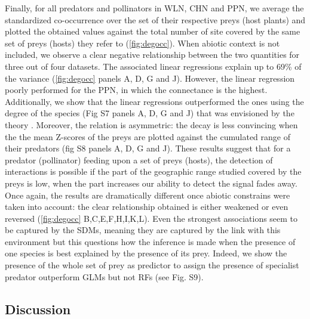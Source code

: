 Finally, for all predators and pollinators in WLN, CHN and PPN, we
average the standardized co-occurrence over the set of their respective
preys (host plants) and plotted the obtained values against the total
number of site covered by the same set of preys (hosts) they refer to
(\ref{fig:degocc}). When abiotic context is not included, we observe a
clear negative relationship between the two quantities for three out of
four datasets. The associated linear regressions explain up to 69\% of
the variance (\ref{fig:degocc} panels A, D, G and J). However, the
linear regression poorly performed for the PPN, in which the connectance
is the highest. Additionally, we show that the linear regressions
outperformed the ones using the degree of the species (Fig S7 panels A,
D, G and J) that was envisioned by the theory \citep{Cazelles2016}.
Moreover, the relation is asymmetric: the decay is less convincing when
the the mean Z-scores of the preys are plotted against the cumulated
range of their predators (fig S8 panels A, D, G and J). These results
suggest that for a predator (pollinator) feeding upon a set of preys
(hosts), the detection of interactions is possible if the part of the
geographic range studied covered by the preys is low, when the part
increases our ability to detect the signal fades away. Once again, the
results are dramatically different once abiotic constrains were taken
into account: the clear relationship obtained is either weakened or even
reversed (\ref{fig:degocc} B,C,E,F,H,I,K,L). Even the strongest
associations seem to be captured by the SDMs, meaning they are captured
by the link with this environment but this questions how the inference
is made when the presence of one species is best explained by the
presence of its prey. Indeed, we show the presence of the whole set of
prey as predictor to assign the presence of specialist predator
outperform GLMs but not RFs (see Fig. S9).

\subsection{Discussion}\label{discussion}

